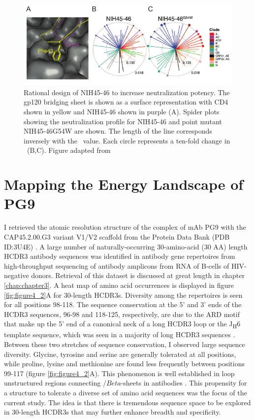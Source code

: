\begin{figure}
   \centering
   \includegraphics{images/chapter4/figure4_1.pdf} %
   \caption[Rational Design of NIH45-46 to Increase Neutralization Potency]{Rational design of NIH45-46 to increase neutralization potency. The gp120 bridging sheet is shown as a surface representation with CD4 shown in yellow and NIH45-46 shown in purple (A). Spider plots showing the neutralization profile for NIH45-46 and point mutant NIH45-46G54W are shown. The length of the line corresponds inversely with the \ic~value. Each circle represents a ten-fold change in \ic~(B,C). Figure adapted from \citep{Diskin:2011hl}}
   \label{fig:figure4_1}
\end{figure}

\section{Mapping the Energy Landscape of PG9}
\label{sec:mapping}
I retrieved the atomic resolution structure of the complex of mAb PG9 with the CAP45.2.00.G3 variant V1/V2 scaffold from the Protein Data Bank (PDB ID:3U4E) \citep{McLellan:2011dg}. A large number of naturally-occurring 30-amino-acid (30 AA) length HCDR3 antibody sequences was identified in antibody gene repertoires from high-throughput sequencing of antibody amplicons from RNA of B-cells of HIV-negative donors. Retrieval of this dataset is discussed at great length in chapter \ref{chap:chapter3}. A heat map of amino acid occurrences is displayed in figure \ref{fig:figure4_2}A for 30-length HCDR3s. Diversity among the repertoires is seen for all positions 98-118. The sequence conservation at the 5' and 3' ends of the HCDR3 sequences, 96-98 and 118-125, respectively, are due to the ARD motif that make up the 5' end of a canonical neck of a long HCDR3 loop or the J\textsubscript{H}6 template sequence, which was seen in a majority of long HCDR3 sequences \citep{North:2011dv,Briney:2012ib}. Between these two stretches of sequence conservation, I observed large sequence diversity. Glycine, tyrosine and serine are generally tolerated at all positions, while proline, lysine and methionine are found less frequently between positions 99-117 (figure \ref{fig:figure4_2}A). This phenomenon is well established in loop unstructured regions connecting $/Beta$-sheets in antibodies \citep{Minuchehr:2005wc,De:2005in}.  This propensity for a structure to tolerate a diverse set of amino acid sequences was the focus of the current study. The idea is that there is tremendous sequence space to be explored in 30-length HCDR3s that may further enhance breadth and specificity.

